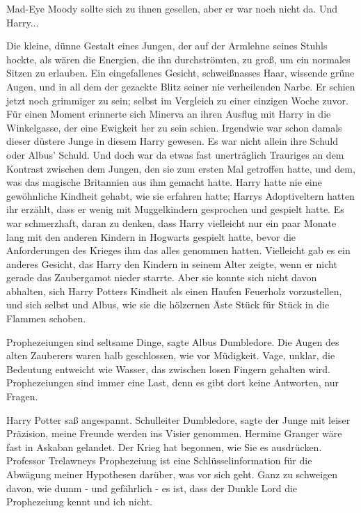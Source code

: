 Mad-Eye Moody sollte sich zu ihnen gesellen, aber er war noch nicht da. Und
Harry...

Die kleine, dünne Gestalt eines Jungen, der auf der Armlehne seines Stuhls
hockte, als wären die Energien, die ihn durchströmten, zu groß, um ein normales
Sitzen zu erlauben. Ein eingefallenes Gesicht, schweißnasses Haar, wissende
grüne Augen, und in all dem der gezackte Blitz seiner nie verheilenden Narbe. Er
schien jetzt noch grimmiger zu sein; selbst im Vergleich zu einer einzigen Woche
zuvor. Für einen Moment erinnerte sich Minerva an ihren Ausflug mit Harry in die
Winkelgasse, der eine Ewigkeit her zu sein schien. Irgendwie war schon damals
dieser düstere Junge in diesem Harry gewesen. Es war nicht allein ihre Schuld
oder Albus' Schuld. Und doch war da etwas fast unerträglich Trauriges an dem
Kontrast zwischen dem Jungen, den sie zum ersten Mal getroffen hatte, und dem,
was das magische Britannien aus ihm gemacht hatte. Harry hatte nie eine
gewöhnliche Kindheit gehabt, wie sie erfahren hatte; Harrys Adoptiveltern hatten
ihr erzählt, dass er wenig mit Muggelkindern gesprochen und gespielt hatte. Es
war schmerzhaft, daran zu denken, dass Harry vielleicht nur ein paar Monate lang
mit den anderen Kindern in Hogwarts gespielt hatte, bevor die Anforderungen des
Krieges ihm das alles genommen hatten. Vielleicht gab es ein anderes Gesicht,
das Harry den Kindern in seinem Alter zeigte, wenn er nicht gerade das
Zaubergamot nieder starrte. Aber sie konnte sich nicht davon abhalten, sich
Harry Potters Kindheit als einen Haufen Feuerholz vorzustellen, und sich selbst
und Albus, wie sie die hölzernen Äste Stück für Stück in die Flammen schoben.

\glqq{}Prophezeiungen sind seltsame Dinge\grqq{}, sagte Albus Dumbledore. Die
Augen des alten Zauberers waren halb geschlossen, wie vor Müdigkeit. \glqq{}Vage,
unklar, die Bedeutung entweicht wie Wasser, das zwischen losen Fingern gehalten
wird. Prophezeiungen sind immer eine Last, denn es gibt dort keine Antworten,
nur Fragen.\grqq{}

Harry Potter saß angespannt. \glqq{}Schulleiter Dumbledore\grqq{}, sagte der
Junge mit leiser Präzision, \glqq{}meine Freunde werden ins Visier genommen.
Hermine Granger wäre fast in Askaban gelandet. Der Krieg hat begonnen, wie Sie
es ausdrücken. Professor Trelawneys Prophezeiung ist eine Schlüsselinformation
für die Abwägung meiner Hypothesen darüber, was vor sich geht. Ganz zu schweigen
davon, wie dumm - und gefährlich - es ist, dass der Dunkle Lord die Prophezeiung
kennt und ich nicht.\grqq{}

